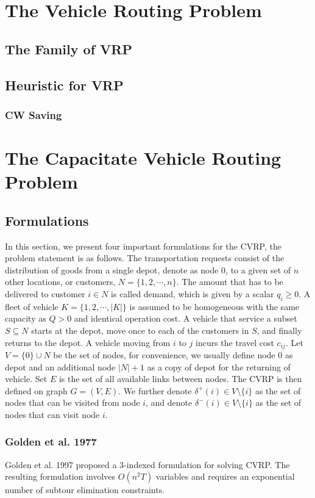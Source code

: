 		\chapter{The Vehicle Routing Problem}
			\section{The Family of VRP}


			\section{Heuristic for VRP}
				\subsection{CW Saving}

		\chapter{The Capacitate Vehicle Routing Problem}
			\section{Formulations}
				In this section, we present four important formulations for the CVRP, the problem statement is as follows. The transportation requests consist of the distribution of goods from a single depot, denote as node 0, to a given set of $n$ other locations, or customers, $N = \{1, 2, \cdots, n\}$. The amount that has to be delivered to customer $i \in N$ is called demand, which is given by a scalar $q_i \ge 0$. A fleet of vehicle $K = \{1, 2, \cdots, |K|\}$ is assumed to be homogeneous with the same capacity as $Q > 0$ and identical operation cost. A vehicle that service a subset $S\subseteq N$ starts at the depot, move once to each of the customers in $S$, and finally returns to the depot. A vehicle moving from $i$ to $j$ incurs the travel cost $c_{ij}$. 
				Let $V = \{0\} \cup N$ be the set of nodes, for convenience, we usually define node 0 as depot and an additional node $|N|+1$ as a copy of depot for the returning of vehicle. Set $E$ is the set of all available links between nodes. The CVRP is then defined on graph $G = (V, E)$. We further denote $\delta^+(i) \in V \setminus \{i\}$ as the set of nodes that can be visited from node $i$, and denote $\delta^-(i) \in V\setminus \{i\}$ as the set of nodes that can visit node $i$.


				\subsection{Golden et al. 1977}
					Golden et al. 1997 proposed a 3-indexed formulation for solving CVRP. The resulting formulation involves $O(n^2T)$ variables and requires an exponential number of subtour elimination constraints. 

